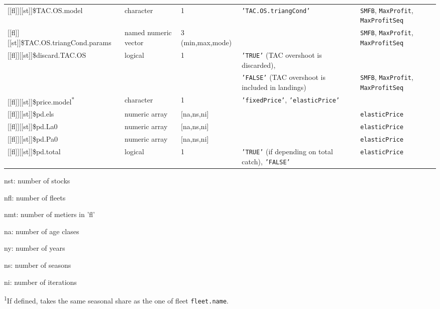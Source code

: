 \begin{landscape}
\begin{table}[!ht]
\begin{footnotesize}
\begin{threeparttable}
\begin{tabular}{lllll}
        {[[fl]]}[[st]]\$TAC.OS.model & character & 1 & \texttt{'TAC.OS.triangCond'} & \texttt{SMFB}, \texttt{MaxProfit}, \texttt{MaxProfitSeq} \\
        {[[fl]]}[[st]]\$TAC.OS.triangCond.params & named numeric vector & 3 (min,max,mode) &  & \texttt{SMFB}, \texttt{MaxProfit}, \texttt{MaxProfitSeq} \\
        {[[fl]]}[[st]]\$discard.TAC.OS & logical & 1 & \texttt{'TRUE'} (TAC overshoot is discarded), \\
         &  &  & \texttt{'FALSE'} (TAC overshoot is included in landings) & \texttt{SMFB}, \texttt{MaxProfit}, \texttt{MaxProfitSeq} \\
        {[[fl]]}[[st]]\$price.model\textsuperscript{*} & character & 1 & \texttt{'fixedPrice'}, \texttt{'elasticPrice'} &  \\
        {[[fl]]}[[st]]\$pd.els & numeric array & [na,ns,ni] &  &  \texttt{elasticPrice} \\
        {[[fl]]}[[st]]\$pd.La0 & numeric array & [na,ns,ni] &  &  \texttt{elasticPrice} \\
        {[[fl]]}[[st]]\$pd.Pa0 & numeric array & [na,ns,ni] &  &  \texttt{elasticPrice} \\
        {[[fl]]}[[st]]\$pd.total & logical & 1 & \texttt{'TRUE'} (if depending on total catch), \texttt{'FALSE'} & 
          \texttt{elasticPrice} \\
        \hline
      \end{tabular}
      
      \begin{tablenotes}
        \item nst: number of stocks
        \item nfl: number of fleets
        \item nmt: number of metiers in 'fl'
        \item na: number of age clases
        \item ny: number of years
        \item ns: number of seasons
        \item ni: number of iterations
        \item \textsuperscript{1}If defined, takes the same seasonal share as the one of fleet \texttt{fleet.name}.
      \end{tablenotes}
      
    \end{threeparttable}
  \end{footnotesize}


\end{table}
\end{landscape}
